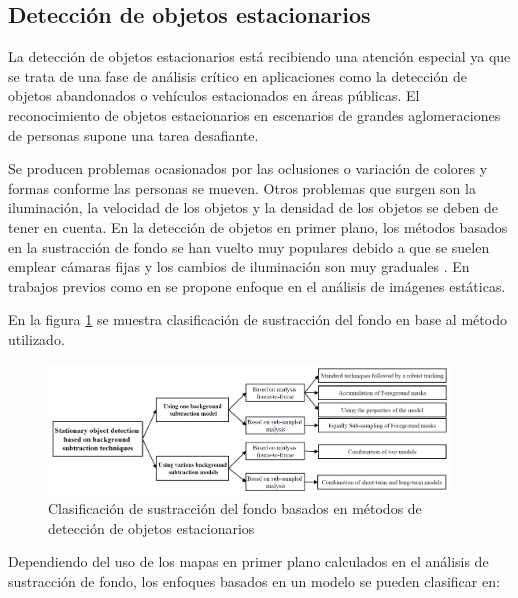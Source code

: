 \subsection{Detección de objetos estacionarios}
\label{subsec:tecnicas-deteccion-obj-estacionarios}

La detección de objetos estacionarios está recibiendo una atención especial ya que se trata de una fase de análisis crítico en aplicaciones como la detección de objetos abandonados o vehículos estacionados en áreas públicas. El reconocimiento de objetos estacionarios en escenarios de grandes aglomeraciones de personas supone una tarea desafiante.

Se producen problemas ocasionados por las oclusiones o variación de colores y formas conforme las personas se mueven. Otros problemas que surgen son la iluminación, la velocidad de los objetos y la densidad de los objetos se deben de tener en cuenta. En la detección de objetos en primer plano, los métodos basados en la sustracción de fondo se han vuelto muy populares debido a que se suelen emplear cámaras fijas y los cambios de iluminación son muy graduales \cite{1217925}. En trabajos previos como en \cite{5279450} se propone enfoque en el análisis de imágenes estáticas.

En la figura \ref{fig:metodos-sustraccion-objeto-estacionario} se muestra clasificación de sustracción del fondo en base al método utilizado.

\begin{figure}[ht]
\centering
\includegraphics[width=0.95\textwidth]{img/chapters/estado-del-arte/metodos-sustraccion-fondo-deteccion-fondo-estacionario.png}
\caption{\label{fig:metodos-sustraccion-objeto-estacionario}Clasificación de sustracción del fondo basados en métodos de detección de objetos estacionarios \cite{5279450}}
\end{figure}

Dependiendo del uso de los mapas en primer plano calculados en el análisis de sustracción de fondo, los enfoques basados en un modelo se pueden clasificar en:

